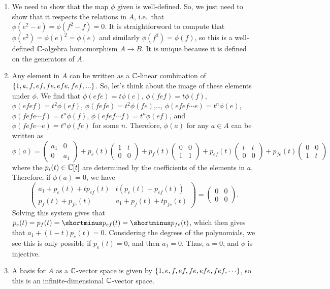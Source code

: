 \begin{solution}
\begin{enumerate}
    \item We need to show that the map $\phi$ given is well-defined. So, we just need to show that it respects the relations in $A$, i.e.\ that $\phi(e^2-e)=\phi(f^2-f)=0$. It is straightforword to compute that $\phi(e^2)=\phi(e)^2 = \phi(e)$ and similarly $\phi(f^2)=\phi(f)$, so this is a well-defined $\mathbb{C}$-algebra homomorphism $A \to B$. It is unique because it is defined on the generators of $A$.
    \item Any element in $A$ can be written as a $\mathbb{C}$-linear combination of $\{1,e,f,ef,fe,efe,fef,...\}$. So, let's think about the image of these elements under $\phi$. We find that $\phi(efe) = t \phi(e)$, $\phi(fef) = t \phi(f),$ $\phi(efef) = t^2 \phi(ef)$, $\phi(fefe)=t^2\phi(fe)$,\dots, $\phi(efef\cdots e) = t^n \phi(e)$, $\phi(fefe\cdots f) = t^n \phi(f)$, $\phi(efef\cdots f)=t^n\phi(ef)$, and $\phi(fefe\cdots e) = t^n \phi(fe)$ for some $n$. Therefore, $\phi(a)$ for any $a \in A$ can be written as
    \[\phi(a) = \begin{pmatrix}
    a_1 & 0\\
    0 & a_1
    \end{pmatrix}
    + p_e(t) \begin{pmatrix}
    1 & t\\
    0 & 0
    \end{pmatrix}
    + p_f(t) \begin{pmatrix}
    0 & 0 \\
    1 & 1
    \end{pmatrix}
    +p_{ef}(t) \begin{pmatrix}
    t & t \\
    0 & 0
    \end{pmatrix}
    + p_{fe}(t) \begin{pmatrix}
    0 & 0\\
    1 & t
    \end{pmatrix}
    \]
    where the $p_i(t) \in \mathbb{C}[t]$ are determined by the coefficients of the elements in $a$. Therefore, if $\phi(a) = 0$, we have
    \[ \begin{pmatrix}
    a_1+p_e(t)+t p_{ef}(t) & t(p_{e}(t)+p_{ef}(t))\\
    p_f(t)+p_{fe}(t) & a_1+p_f(t)+t p_{fe}(t)
    \end{pmatrix}
    = \begin{pmatrix}
    0 & 0\\
    0 & 0
    \end{pmatrix}.
    \]
    Solving this system gives that $p_e(t)=p_f(t)=\shortminus p_{ef}(t)=\shortminus p_{fe}(t)$, which then gives that $a_1+(1-t)p_e(t)=0$. Considering the degrees of the polynomials, we see this is only possible if $p_e(t)=0$, and then $a_1=0$. Thus, $a=0$, and $\phi$ is injective.
    \item A basis for $A$ as a $\mathbb{C}$-vector space is given by $\set{1,e,f,ef,fe, efe, fef,\cdots}$, so this is an infinite-dimensional $\mathbb{C}$-vector space.
\end{enumerate}
\end{solution}

